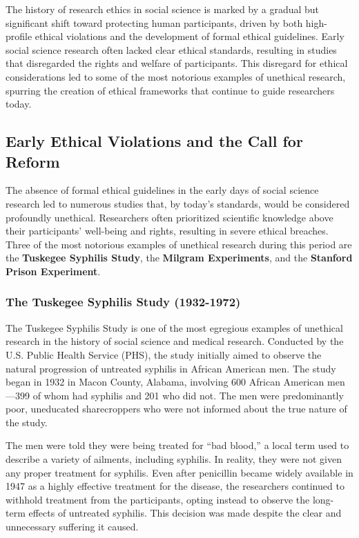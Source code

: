 \documentclass[
]{book}
\begin{document}
The history of research ethics in social science is marked by a gradual but significant shift toward protecting human participants, driven by both high-profile ethical violations and the development of formal ethical guidelines. Early social science research often lacked clear ethical standards, resulting in studies that disregarded the rights and welfare of participants. This disregard for ethical considerations led to some of the most notorious examples of unethical research, spurring the creation of ethical frameworks that continue to guide researchers today.

\subsection*{Early Ethical Violations and the Call for Reform}\label{early-ethical-violations-and-the-call-for-reform}

The absence of formal ethical guidelines in the early days of social science research led to numerous studies that, by today's standards, would be considered profoundly unethical. Researchers often prioritized scientific knowledge above their participants' well-being and rights, resulting in severe ethical breaches. Three of the most notorious examples of unethical research during this period are the \textbf{Tuskegee Syphilis Study}, the \textbf{Milgram Experiments}, and the \textbf{Stanford Prison Experiment}.

\subsubsection*{The Tuskegee Syphilis Study (1932-1972)}\label{the-tuskegee-syphilis-study-1932-1972}

The Tuskegee Syphilis Study is one of the most egregious examples of unethical research in the history of social science and medical research. Conducted by the U.S. Public Health Service (PHS), the study initially aimed to observe the natural progression of untreated syphilis in African American men. The study began in 1932 in Macon County, Alabama, involving 600 African American men---399 of whom had syphilis and 201 who did not. The men were predominantly poor, uneducated sharecroppers who were not informed about the true nature of the study.

The men were told they were being treated for ``bad blood,'' a local term used to describe a variety of ailments, including syphilis. In reality, they were not given any proper treatment for syphilis. Even after penicillin became widely available in 1947 as a highly effective treatment for the disease, the researchers continued to withhold treatment from the participants, opting instead to observe the long-term effects of untreated syphilis. This decision was made despite the clear and unnecessary suffering it caused.
\end{document}
